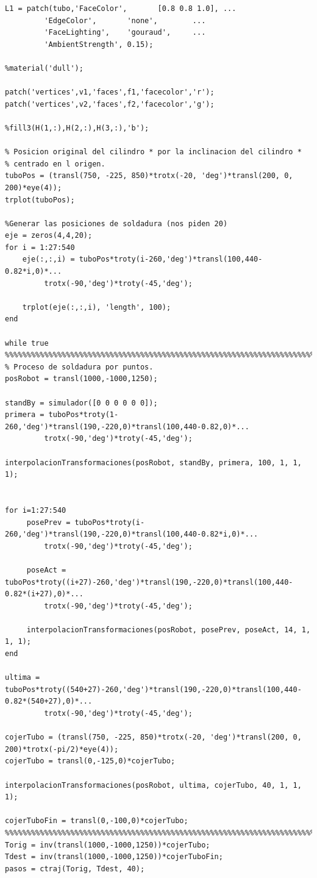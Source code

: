 \documentclass{article}
\begin{document}
\begin{lstlisting}[frame=single]
L1 = patch(tubo,'FaceColor',       [0.8 0.8 1.0], ...
         'EdgeColor',       'none',        ...
         'FaceLighting',    'gouraud',     ...
         'AmbientStrength', 0.15);
     
%material('dull');

patch('vertices',v1,'faces',f1,'facecolor','r'); 
patch('vertices',v2,'faces',f2,'facecolor','g');

%fill3(H(1,:),H(2,:),H(3,:),'b');  

% Posicion original del cilindro * por la inclinacion del cilindro *
% centrado en l origen.
tuboPos = (transl(750, -225, 850)*trotx(-20, 'deg')*transl(200, 0, 200)*eye(4));
trplot(tuboPos);

%Generar las posiciones de soldadura (nos piden 20)
eje = zeros(4,4,20);
for i = 1:27:540
    eje(:,:,i) = tuboPos*troty(i-260,'deg')*transl(100,440-0.82*i,0)*...
         trotx(-90,'deg')*troty(-45,'deg');
     
    trplot(eje(:,:,i), 'length', 100);
end

while true
%%%%%%%%%%%%%%%%%%%%%%%%%%%%%%%%%%%%%%%%%%%%%%%%%%%%%%%%%%%%%%%%%%%%%%%%%%%
% Proceso de soldadura por puntos.
posRobot = transl(1000,-1000,1250);

standBy = simulador([0 0 0 0 0 0]);
primera = tuboPos*troty(1-260,'deg')*transl(190,-220,0)*transl(100,440-0.82,0)*...
         trotx(-90,'deg')*troty(-45,'deg'); 

interpolacionTransformaciones(posRobot, standBy, primera, 100, 1, 1, 1);


for i=1:27:540
     posePrev = tuboPos*troty(i-260,'deg')*transl(190,-220,0)*transl(100,440-0.82*i,0)*...
         trotx(-90,'deg')*troty(-45,'deg'); 
    
     poseAct = tuboPos*troty((i+27)-260,'deg')*transl(190,-220,0)*transl(100,440-0.82*(i+27),0)*...
         trotx(-90,'deg')*troty(-45,'deg');
     
     interpolacionTransformaciones(posRobot, posePrev, poseAct, 14, 1, 1, 1);
end

ultima = tuboPos*troty((540+27)-260,'deg')*transl(190,-220,0)*transl(100,440-0.82*(540+27),0)*...
         trotx(-90,'deg')*troty(-45,'deg');

cojerTubo = (transl(750, -225, 850)*trotx(-20, 'deg')*transl(200, 0, 200)*trotx(-pi/2)*eye(4)); 
cojerTubo = transl(0,-125,0)*cojerTubo;

interpolacionTransformaciones(posRobot, ultima, cojerTubo, 40, 1, 1, 1);

cojerTuboFin = transl(0,-100,0)*cojerTubo;
%%%%%%%%%%%%%%%%%%%%%%%%%%%%%%%%%%%%%%%%%%%%%%%%%%%%%%%%%%%%%%%%%%%%%%%%%%%
Torig = inv(transl(1000,-1000,1250))*cojerTubo;
Tdest = inv(transl(1000,-1000,1250))*cojerTuboFin;
pasos = ctraj(Torig, Tdest, 40);


\end{lstlisting}
\end{document}
